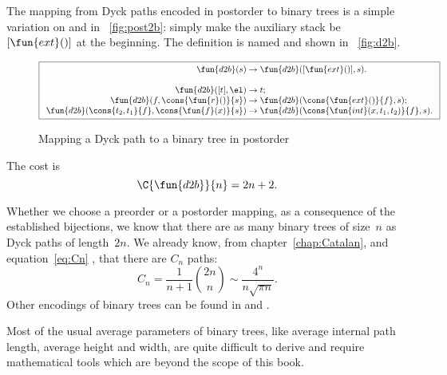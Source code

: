 The mapping from Dyck paths encoded in postorder to
binary trees is a simple variation on
 and
 in \fig~\vref{fig:post2b}:
simply make the auxiliary stack be \([\fun{ext}()]\) at the
beginning. The definition is named 
and shown in \fig~\vref{fig:d2b}.
\begin{figure}
\begin{equation*}
\boxed{
\begin{array}{r@{\;}c@{\;}l}
\fun{d2b}(s) & \rightarrow & \fun{d2b}([\fun{ext}()],s).\\
\\
\fun{d2b}([t],\el) & \rightarrow & t;\\
\fun{d2b}(f,\cons{\fun{r}()}{s}) & \rightarrow & \fun{d2b}(\cons{\fun{ext}()}{f},s);\\
\fun{d2b}(\cons{t_2,t_1}{f},\cons{\fun{f}(x)}{s}) & \rightarrow & \fun{d2b}(\cons{\fun{int}(x,t_1,t_2)}{f},s).
\end{array}}
\end{equation*}
\caption{Mapping a Dyck path to a binary tree in postorder}
\label{fig:d2b}
\end{figure}
The cost is
\begin{equation*}
  \C{\fun{d2b}}{n} = 2n + 2.
  \index{d2b@$\C{\fun{d2b}}{n}$}
\end{equation*}

Whether we choose a preorder or a postorder mapping, as a consequence
of the established bijections, we know that there are as many binary
trees of size~\(n\) as Dyck paths of length~\(2n\). We already know,
from chapter~\ref{chap:Catalan}, and equation~\eqref{eq:Cn}
, that there are \(C_n\) paths:
\begin{equation*}
  C_n = \frac{1}{n+1}\binom{2n}{n} \sim \frac{4^n}{n\sqrt{\pi n}}.
\end{equation*}
Other encodings of binary trees can be found
in \cite[2.3.3]{Knuth_1997} and \cite[5.11]{SedgewickFlajolet_1996}.


Most of the usual average parameters of binary trees, like
average internal path length, average height and width, are quite
difficult to derive and require mathematical tools which are beyond
the scope of this book.

